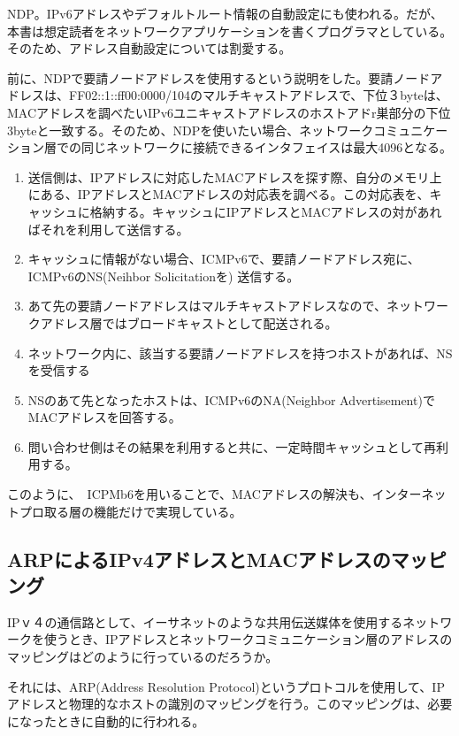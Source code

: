 NDP。IPv6アドレスやデフォルトルート情報の自動設定にも使われる。だが、本書は想定読者をネットワークアプリケーションを書くプログラマとしている。そのため、アドレス自動設定については割愛する。

前に、NDPで要請ノードアドレスを使用するという説明をした。要請ノードアドレスは、FF02::1::ff00:0000/104のマルチキャストアドレスで、下位３byteは、MACアドレスを調べたいIPv6ユニキャストアドレスのホストアドr巣部分の下位3byteと一致する。そのため、NDPを使いたい場合、ネットワークコミュニケーション層での同じネットワークに接続できるインタフェイスは最大4096となる。


\begin{enumerate}
\item 送信側は、IPアドレスに対応したMACアドレスを探す際、自分のメモリ上にある、IPアドレスとMACアドレスの対応表を調べる。この対応表を、キャッシュに格納する。キャッシュにIPアドレスとMACアドレスの対があればそれを利用して送信する。
\item キャッシュに情報がない場合、ICMPv6で、要請ノードアドレス宛に、ICMPv6のNS(Neihbor Solicitationを)
送信する。
\item あて先の要請ノードアドレスはマルチキャストアドレスなので、ネットワークアドレス層ではブロードキャストとして配送される。
\item ネットワーク内に、該当する要請ノードアドレスを持つホストがあれば、NSを受信する
\item NSのあて先となったホストは、ICMPv6のNA(Neighbor Advertisement)でMACアドレスを回答する。
\item 問い合わせ側はその結果を利用すると共に、一定時間キャッシュとして再利用する。
\end{enumerate}

このように、　ICPMb6を用いることで、MACアドレスの解決も、インターネットプロ取る層の機能だけで実現している。

\subsection{ARPによるIPv4アドレスとMACアドレスのマッピング}

IPｖ４の通信路として、イーサネットのような共用伝送媒体を使用するネットワークを使うとき、IPアドレスとネットワークコミュニケーション層のアドレスのマッピングはどのように行っているのだろうか。

それには、ARP(Address Resolution Protocol)というプロトコルを使用して、IPアドレスと物理的なホストの識別のマッピングを行う。このマッピングは、必要になったときに自動的に行われる。


